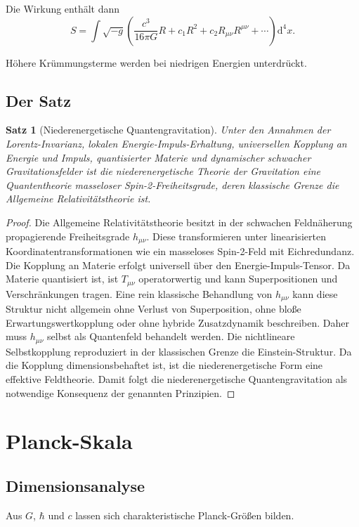 \documentclass[11pt,a4paper,oneside]{book}
\theoremstyle{definition}
\theoremstyle{plain}
\newtheorem{satz}[definition]{Satz}
\theoremstyle{remark}
\newcommand{\dd}{\mathrm{d}}
\begin{document}
Die Wirkung enthält dann
\[
S=\int \sqrt{-g}\left(\frac{c^3}{16\pi G}R + c_1 R^2 + c_2 R_{\mu\nu}R^{\mu\nu}+\cdots\right)\dd^4x.
\]

Höhere Krümmungsterme werden bei niedrigen Energien unterdrückt.

\section{Der Satz}
\begin{satz}[Niederenergetische Quantengravitation]
Unter den Annahmen der Lorentz-Invarianz, lokalen Energie-Impuls-Erhaltung, universellen Kopplung an Energie und Impuls, quantisierter Materie und dynamischer schwacher Gravitationsfelder ist die niederenergetische Theorie der Gravitation eine Quantentheorie masseloser Spin-2-Freiheitsgrade, deren klassische Grenze die Allgemeine Relativitätstheorie ist.
\end{satz}

\begin{proof}
Die Allgemeine Relativitätstheorie besitzt in der schwachen Feldnäherung propagierende Freiheitsgrade $h_{\mu\nu}$. Diese transformieren unter linearisierten Koordinatentransformationen wie ein masseloses Spin-2-Feld mit Eichredundanz. Die Kopplung an Materie erfolgt universell über den Energie-Impuls-Tensor. Da Materie quantisiert ist, ist $T_{\mu\nu}$ operatorwertig und kann Superpositionen und Verschränkungen tragen. Eine rein klassische Behandlung von $h_{\mu\nu}$ kann diese Struktur nicht allgemein ohne Verlust von Superposition, ohne bloße Erwartungswertkopplung oder ohne hybride Zusatzdynamik beschreiben. Daher muss $h_{\mu\nu}$ selbst als Quantenfeld behandelt werden. Die nichtlineare Selbstkopplung reproduziert in der klassischen Grenze die Einstein-Struktur. Da die Kopplung dimensionsbehaftet ist, ist die niederenergetische Form eine effektive Feldtheorie. Damit folgt die niederenergetische Quantengravitation als notwendige Konsequenz der genannten Prinzipien.
\end{proof}

\chapter{Planck-Skala}
\section{Dimensionsanalyse}
Aus $G$, $\hbar$ und $c$ lassen sich charakteristische Planck-Größen bilden.
\end{document}
